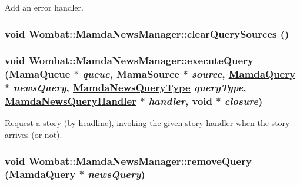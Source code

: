 Add an error handler. 

\hypertarget{classWombat_1_1MamdaNewsManager_3c8ca28fed15f8c88a8d646348a65d38}{
\subsubsection[clearQuerySources]{\setlength{\rightskip}{0pt plus 5cm}void Wombat::Mamda\-News\-Manager::clear\-Query\-Sources ()}}
\label{classWombat_1_1MamdaNewsManager_3c8ca28fed15f8c88a8d646348a65d38}


\hypertarget{classWombat_1_1MamdaNewsManager_0ac9a7acd98ae805071fc174905fe5b5}{
\subsubsection[executeQuery]{\setlength{\rightskip}{0pt plus 5cm}void Wombat::Mamda\-News\-Manager::execute\-Query (Mama\-Queue $\ast$ {\em queue}, Mama\-Source $\ast$ {\em source}, \hyperlink{classWombat_1_1MamdaQuery}{Mamda\-Query} $\ast$ {\em news\-Query}, \hyperlink{namespaceWombat_8c12fe7ccc6f40bd1efe733bb0673ad5}{Mamda\-News\-Query\-Type} {\em query\-Type}, \hyperlink{classWombat_1_1MamdaNewsQueryHandler}{Mamda\-News\-Query\-Handler} $\ast$ {\em handler}, void $\ast$ {\em closure})}}
\label{classWombat_1_1MamdaNewsManager_0ac9a7acd98ae805071fc174905fe5b5}


Request a story (by headline), invoking the given story handler when the story arrives (or not). 

\hypertarget{classWombat_1_1MamdaNewsManager_b30507a8bef38f19cb181b7727481fb4}{
\subsubsection[removeQuery]{\setlength{\rightskip}{0pt plus 5cm}void Wombat::Mamda\-News\-Manager::remove\-Query (\hyperlink{classWombat_1_1MamdaQuery}{Mamda\-Query} $\ast$ {\em news\-Query})}}
\label{classWombat_1_1MamdaNewsManager_b30507a8bef38f19cb181b7727481fb4}


